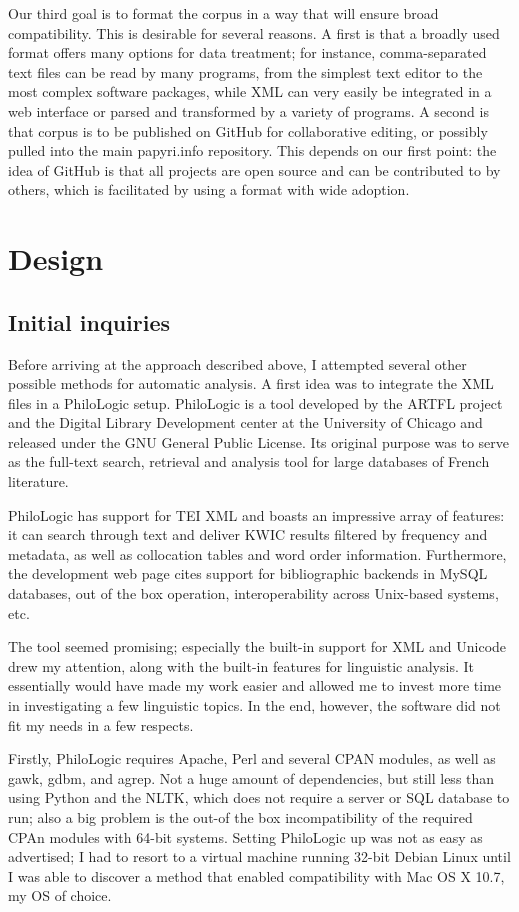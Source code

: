 \documentclass[10pt,a4paper,twoside,openright,titlepage,fleqn,%
               headinclude,,footinclude,BCOR5mm,%
               numbers=noenddot,cleardoublepage=empty,%
               tablecaptionabove]{scrbook}
\begin{document}
Our third goal is to format the corpus in a way that will ensure broad
compatibility. This is desirable for several reasons. A first is that a broadly
used format offers many options for data treatment; for instance,
comma-separated text files can be read by many programs, from the simplest text
editor to the most complex software packages, while XML can very easily be
integrated in a web interface or parsed and transformed by a variety of
programs. A second is that corpus is to be published on GitHub for
collaborative editing, or possibly pulled into the main papyri.info repository.
This depends on our first point: the idea of GitHub is that all projects are
open source and can be contributed to by others, which is facilitated by using a
format with wide adoption.

\section{Design}
\subsection{Initial inquiries}

Before arriving at the approach described above, I attempted several other
possible methods for automatic analysis. A first idea was to integrate the XML
files in a PhiloLogic setup.  PhiloLogic is a tool developed by the ARTFL
project and the Digital Library Development center at the University of Chicago
and released under the GNU General Public License. Its original purpose was to
serve as the full-text search, retrieval and analysis tool for large databases
of French literature.

PhiloLogic has support for TEI XML and boasts an impressive
array of features: it can search through text and deliver KWIC results
filtered by frequency and metadata, as well as collocation tables and word
order information.  Furthermore, the development web page cites support for
bibliographic backends in MySQL databases, out of the box operation,
interoperability across Unix-based systems, etc.

The tool seemed promising; especially the built-in support for XML and
Unicode drew my attention, along with the built-in features for linguistic
analysis. It essentially would have made my work easier and allowed me to
invest more time in investigating a few linguistic topics. In the end, however,
the software did not fit my needs in a few respects.

Firstly, PhiloLogic requires Apache, Perl and several CPAN modules, as well as
gawk, gdbm, and agrep.  Not a huge amount of dependencies, but still less than
using Python and the NLTK, which does not require a server or SQL database to
run; also a big problem is the out-of the box incompatibility of the required
CPAn  modules with 64-bit systems. Setting PhiloLogic up was not as
easy as advertised; I had to resort to a virtual machine running 32-bit Debian
Linux until I was able to discover a method that enabled compatibility with
Mac OS X 10.7, my OS of choice.
\end{document}
